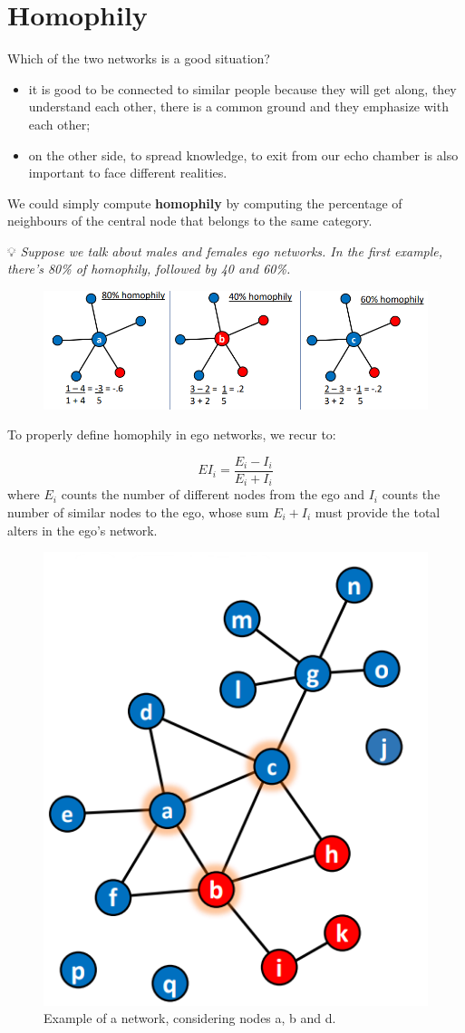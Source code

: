 \documentclass[
  notitlepage,
  onecolumn,
  openany]{book}
\providecommand{\tightlist}{%
  \setlength{\itemsep}{0pt}\setlength{\parskip}{0pt}}
\begin{document}
\hypertarget{homophily}{%
\section{Homophily}\label{homophily}}

Which of the two networks is a good situation?

\begin{itemize}
\tightlist
\item
  it is good to be connected to similar people because they will get along, they understand each other, there is a common ground and they emphasize with each other;
\item
  on the other side, to spread knowledge, to exit from our echo chamber is also important to face different realities.
\end{itemize}

We could simply compute \textbf{homophily} by computing the percentage of neighbours of the central node that belongs to the same category.

💡 \emph{Suppose we talk about males and females ego networks. In the first example, there's 80\% of homophily, followed by 40 and 60\%.}

\begin{figure}[h!]

{\centering \includegraphics[width=0.5\linewidth]{images/06-Attributes based measures/Untitled 2} 

}

\end{figure}

To properly define homophily in ego networks, we recur to:

\[
EI_i = \frac{E_i-I_i}{E_i+I_i}
\]
where \(E_i\) counts the number of different nodes from the ego and \(I_i\) counts the number of similar nodes to the ego, whose sum \(E_i+I_i\) must provide the total alters in the ego's network.

\begin{figure}[h!]

{\centering \includegraphics[width=0.3\linewidth]{images/06-Attributes based measures/Untitled 3} 

}

\caption{Example of a network, considering nodes a, b and d.}\label{fig:unnamed-chunk-36}
\end{figure}
\end{document}
